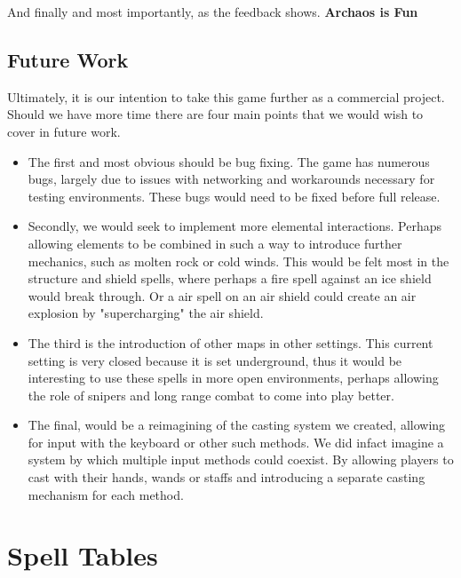 \documentclass[12pt,a4paper]{report}
\begin{document}
And finally and most importantly, as the feedback shows. \textbf{Archaos is Fun}

\section{Future Work}

Ultimately, it is our intention to take this game further as a commercial project. Should we have more time there are four main points that we would wish to cover in future work.

\begin{itemize}
	\item The first and most obvious should be bug fixing. The game has numerous bugs, largely due to issues with networking and workarounds necessary for testing environments. These bugs would need to be fixed before full release.

	\item Secondly, we would seek to implement more elemental interactions. Perhaps allowing elements to be combined in such a way to introduce further mechanics, such as molten rock or cold winds. This would be felt most in the structure and shield spells, where perhaps a fire spell against an ice shield would break through. Or a air spell on an air shield could create an air explosion by "supercharging" the air shield.

	\item The third is the introduction of other maps in other settings. This current setting is very closed because it is set underground, thus it would be interesting to use these spells in more open environments, perhaps allowing the role of snipers and long range combat to come into play better.

	\item The final, would be a reimagining of the casting system we created, allowing for input with the keyboard or other such methods. We did infact imagine a system by which multiple input methods could coexist. By allowing players to cast with their hands, wands or staffs and introducing a separate casting mechanism for each method.
\end{itemize}

\printbibliography

\appendix

\chapter{Spell Tables}
\end{document}
